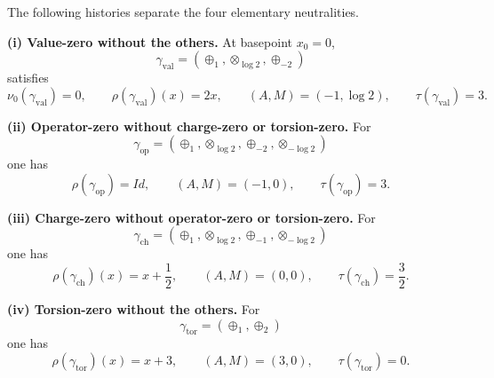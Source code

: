 \begin{proposition}
\label{prop:appE-separation-examples}
The following histories separate the four elementary neutralities.

\smallskip
\noindent
\textbf{(i) Value-zero without the others.}
At basepoint $x_0=0$,
\[
\gamma_{\mathrm{val}}=(\oplus_1,\otimes_{\log 2},\oplus_{-2})
\]
satisfies
\[
\nu_0(\gamma_{\mathrm{val}})=0,
\qquad
\rho(\gamma_{\mathrm{val}})(x)=2x,
\qquad
(A,M)=(-1,\log 2),
\qquad
\tau(\gamma_{\mathrm{val}})=3.
\]

\smallskip
\noindent
\textbf{(ii) Operator-zero without charge-zero or torsion-zero.}
For
\[
\gamma_{\mathrm{op}}=(\oplus_1,\otimes_{\log 2},\oplus_{-2},\otimes_{-\log 2})
\]
one has
\[
\rho(\gamma_{\mathrm{op}})=Id,
\qquad
(A,M)=(-1,0),
\qquad
\tau(\gamma_{\mathrm{op}})=3.
\]

\smallskip
\noindent
\textbf{(iii) Charge-zero without operator-zero or torsion-zero.}
For
\[
\gamma_{\mathrm{ch}}=(\oplus_1,\otimes_{\log 2},\oplus_{-1},\otimes_{-\log 2})
\]
one has
\[
\rho(\gamma_{\mathrm{ch}})(x)=x+\frac12,
\qquad
(A,M)=(0,0),
\qquad
\tau(\gamma_{\mathrm{ch}})=\frac32.
\]

\smallskip
\noindent
\textbf{(iv) Torsion-zero without the others.}
For
\[
\gamma_{\mathrm{tor}}=(\oplus_1,\oplus_2)
\]
one has
\[
\rho(\gamma_{\mathrm{tor}})(x)=x+3,
\qquad
(A,M)=(3,0),
\qquad
\tau(\gamma_{\mathrm{tor}})=0.
\]
\end{proposition}

